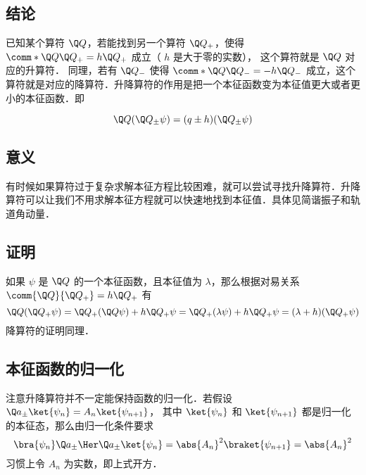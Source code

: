 

\subsection{结论}

已知某个算符 $\Q Q$，若能找到另一个算符 $\Q Q_+$，使得 $\comm*{\Q Q}{\Q Q_+} = h \Q Q_+$ 成立（ $h$ 是大于零的实数）， 这个算符就是 $\Q Q$ 对应的升算符． 同理，若有 $\Q Q_-$ 使得 $\comm*{\Q Q}{\Q Q_-} = - h\Q Q_-$ 成立，这个算符就是对应的降算符．升降算符的作用是把一个本征函数变为本征值更大或者更小的本征函数．即

\begin{equation}\label{RLop_eq1}
\Q Q(\Q Q_\pm\psi) = (q \pm h) (\Q Q_ \pm\psi)
\end{equation}

\subsection{意义}
有时候如果算符过于复杂求解本征方程比较困难，就可以尝试寻找升降算符．升降算符可以让我们不用求解本征方程就可以快速地找到本征值．具体见简谐振子和轨道角动量．%

\subsection{证明}
如果 $\psi$ 是 $\Q Q$ 的一个本征函数，且本征值为 $\lambda$，那么根据对易关系 $\comm{\Q Q}{\Q Q_+} = h \Q Q_+$ 有
\begin{equation}
\Q Q (\Q Q_+ \psi) = \Q Q_+ (\Q Q\psi) + h \Q Q_+ \psi  = \Q Q_+ (\lambda \psi) + h \Q Q_+ \psi  = (\lambda  + h)(\Q Q_+ \psi)
\end{equation}
降算符的证明同理．

\subsection{本征函数的归一化}
注意升降算符并不一定能保持函数的归一化．若假设 $\Q a_\pm \ket{\psi_n} = A_n \ket{\psi_{n+1}}$， 其中 $\ket{\psi_n}$ 和 $\ket{\psi_{n + 1}}$ 都是归一化的本征态，那么由归一化条件要求
\begin{equation}
\bra{\psi_n} \Q a_\pm\Her \Q a_\pm \ket{\psi_n} = \abs{A_n}^2 \braket{\psi_{n+1}} = \abs{A_n}^2
\end{equation}
习惯上令 $A_n$ 为实数，即上式开方． 
